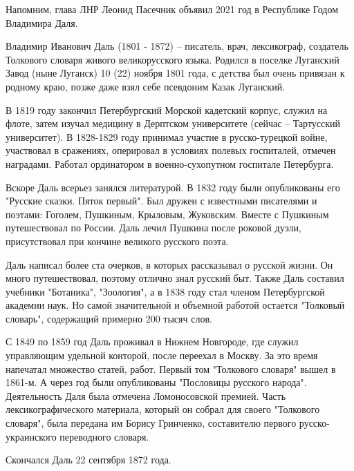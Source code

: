 Напомним, глава ЛНР Леонид Пасечник объявил 2021 год в Республике Годом
Владимира Даля.

Владимир Иванович Даль (1801 - 1872) – писатель, врач, лексикограф, создатель
Толкового словаря живого великорусского языка. Родился в поселке Луганский
Завод (ныне Луганск) 10 (22) ноября 1801 года, с детства был очень привязан к
родному краю, позже даже взял себе псевдоним Казак Луганский.

В 1819 году закончил Петербургский Морской кадетский корпус, служил на флоте,
затем изучал медицину в Дерптском университете (сейчас – Тартусский
университет). В 1828-1829 году принимал участие в русско-турецкой войне,
участвовал в сражениях, оперировал в условиях полевых госпиталей, отмечен
наградами. Работал ординатором в военно-сухопутном госпитале Петербурга.

Вскоре Даль всерьез занялся литературой. В 1832 году были опубликованы его
"Русские сказки. Пяток первый". Был дружен с известными писателями и поэтами:
Гоголем, Пушкиным, Крыловым, Жуковским. Вместе с Пушкиным путешествовал по
России. Даль лечил Пушкина после роковой дуэли, присутствовал при кончине
великого русского поэта.

Даль написал более ста очерков, в которых рассказывал о русской жизни. Он много
путешествовал, поэтому отлично знал русский быт. Также Даль составил учебники
"Ботаника", "Зоология", а в 1838 году стал членом Петербургской академии наук.
Но самой значительной и объемной работой остается "Толковый словарь",
содержащий примерно 200 тысяч слов.

С 1849 по 1859 год Даль проживал в Нижнем Новгороде, где служил управляющим
удельной конторой, после переехал в Москву. За это время напечатал множество
статей, работ. Первый том "Толкового словаря" вышел в 1861-м. А через год были
опубликованы "Пословицы русского народа". Деятельность Даля была отмечена
Ломоносовской премией. Часть лексикографического материала, который он собрал
для своего "Толкового словаря", была передана им Борису Гринченко, составителю
первого русско-украинского переводного словаря.

Скончался Даль 22 сентября 1872 года.
